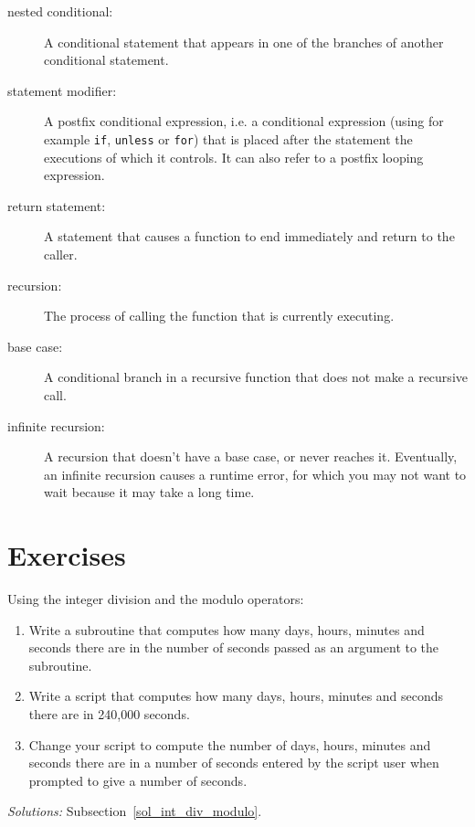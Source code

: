\begin{description}
\item[nested conditional:]  A conditional statement that appears
in one of the branches of another conditional statement.

\item[statement modifier:] A postfix conditional expression, i.e. 
a conditional expression (using for example {\tt if}, {\tt unless} or 
{\tt for}) that is placed after the statement the executions of which 
it controls. It can also refer to a postfix looping expression.

\item[return statement:] A statement that causes a function to
end immediately and return to the caller.

\item[recursion:]  The process of calling the function that is
currently executing.

\item[base case:]  A conditional branch in a
recursive function that does not make a recursive call.

\item[infinite recursion:]  A recursion that doesn't have a
base case, or never reaches it.  Eventually, an infinite 
recursion causes a runtime error, for which you may not want 
to wait because it may take a long time.

\end{description}

\section{Exercises}
%

\begin{exercise}
%
Using the integer division and the modulo operators:
\label{int_div_modulo}

\begin{enumerate}

\item Write a subroutine that computes how many days, hours, minutes and seconds there are in the number of seconds passed as an argument to the subroutine.

\item Write a script that computes how many days, hours, minutes and seconds there are in 240,000 seconds.

\item Change your script to compute the number of days, hours, minutes and seconds there are in a number of seconds entered by the script user when prompted to give a number of seconds.

\end{enumerate}

\emph{Solutions:} Subsection~\ref{sol_int_div_modulo}.

\end{exercise}


